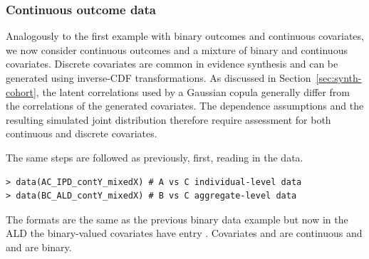 \documentclass[article]{jss}
\begin{document}
\subsubsection{Continuous outcome data}
Analogously to the first example with binary outcomes and continuous covariates, we now consider continuous outcomes and a mixture of binary and continuous covariates. Discrete covariates are common in evidence synthesis and can be generated using inverse-CDF transformations. As discussed in Section~\ref{sec:synth-cohort}, the latent correlations used by a Gaussian copula generally differ from the correlations of the generated covariates. The dependence assumptions and the resulting simulated joint distribution therefore require assessment for both continuous and discrete covariates.

The same steps are followed as previously, first, reading in the data.

\begin{verbatim}
> data(AC_IPD_contY_mixedX) # A vs C individual-level data
> data(BC_ALD_contY_mixedX) # B vs C aggregate-level data
\end{verbatim}




The formats are the same as the previous binary data example but now in the ALD the binary-valued covariates have  entry . Covariates  and  are continuous and  and  are binary.
\end{document}

